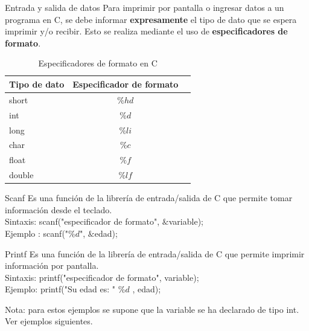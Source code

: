 \documentclass[xcolor=pdftex,table,11pt]{beamer}
\begin{document}
\begin{frame}[allowframebreaks] {Entrada y salida de datos}
Para imprimir por pantalla o ingresar datos a un programa en C, se debe informar \textbf{expresamente} el tipo de dato que se espera imprimir y/o recibir.
Esto se realiza mediante el uso de \textbf{especificadores de formato}.

\begin{table}
\begin{tabular}{l | c | l }
Tipo de dato & Especificador de formato \\
\hline \hline
short & $\%hd$ \\ 
int & 	$\%d$ \\ 
long & 	$\%li$ \\ 
char & $\%c$\\ 
float & $\%f$ \\ 
double & $\%lf$\\ 
\end{tabular}
\caption{Especificadores de formato en C}
\end{table}
 \begin{block}{Scanf}
Es una función de la librería de entrada/salida de C que permite tomar información desde el teclado.\\ 

Sintaxis: scanf("especificador de formato", $\&$variable); \\ 
Ejemplo	: scanf("$\%d$", $\&$edad); \\ 
    \end{block}

 \begin{block}{Printf}
Es una función de la librería de entrada/salida de C que permite imprimir información por pantalla.\\ 
Sintaxis: printf("especificador de formato", variable); \\ 
Ejemplo: printf("Su edad es: " $\%d$ , edad);
    \end{block}
    
Nota: para estos ejemplos se supone que la variable se ha declarado de tipo int. Ver ejemplos siguientes.
\codesetstylefrombeamer
{}
\end{frame}
\end{document}
